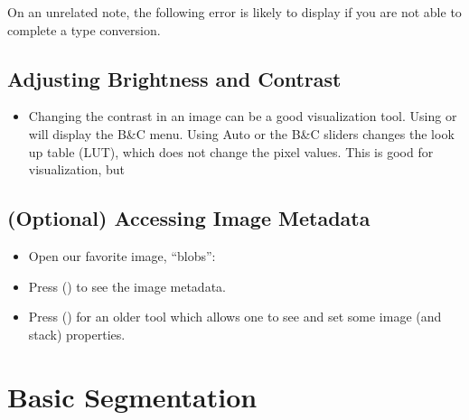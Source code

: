 \documentclass[letterpaper,10pt,english]{jupyterBook}
\begin{document}
\sphinxAtStartPar
On an unrelated note, the following error is likely to display if you
are not able to complete a type conversion.

\sphinxAtStartPar
{}


\section{Adjusting Brightness and Contrast}
\label{\detokenize{basics:adjusting-brightness-and-contrast}}\begin{itemize}
\item {} 
\sphinxAtStartPar
Changing the contrast in an image can be a good visualization tool. Using  or  will display the B\&C menu. Using
Auto or the B\&C sliders changes the look up table (LUT), which does not change the pixel values. This is good for visualization, but 

\end{itemize}


\section{(Optional) Accessing Image Metadata}
\label{\detokenize{basics:optional-accessing-image-metadata}}\begin{itemize}
\item {} 
\sphinxAtStartPar
Open our favorite image, “blobs”: 

\item {} 
\sphinxAtStartPar
Press  () to see the image metadata.

\item {} 
\sphinxAtStartPar
Press  () for an older tool which allows one to see and set some image (and stack) properties.

\end{itemize}

\sphinxstepscope


\chapter{Basic Segmentation}
\label{\detokenize{basic-segmentation:basic-segmentation}}\label{\detokenize{basic-segmentation::doc}}
\end{document}
